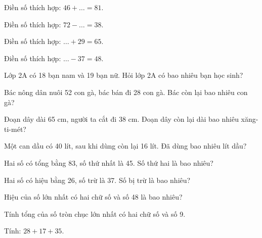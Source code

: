 \begin{ex}
Điền số thích hợp: $46 + \dots = 81$.
\end{ex}

\begin{ex}
Điền số thích hợp: $72 - \dots = 38$.
\end{ex}

\begin{ex}
Điền số thích hợp: $\dots + 29 = 65$.
\end{ex}

\begin{ex}
Điền số thích hợp: $\dots - 37 = 48$.
\end{ex}

\begin{ex}
Lớp 2A có 18 bạn nam và 19 bạn nữ. Hỏi lớp 2A có bao nhiêu bạn học sinh?
\end{ex}

\begin{ex}
Bác nông dân nuôi 52 con gà, bác bán đi 28 con gà. Bác còn lại bao nhiêu con gà?
\end{ex}

\begin{ex}
Đoạn dây dài 65 cm, người ta cắt đi 38 cm. Đoạn dây còn lại dài bao nhiêu xăng-ti-mét?
\end{ex}

\begin{ex}
Một can dầu có 40 lít, sau khi dùng còn lại 16 lít. Đã dùng bao nhiêu lít dầu?
\end{ex}

\begin{ex}
Hai số có tổng bằng 83, số thứ nhất là 45. Số thứ hai là bao nhiêu?
\end{ex}

\begin{ex}
Hai số có hiệu bằng 26, số trừ là 37. Số bị trừ là bao nhiêu?
\end{ex}

\begin{ex}
Hiệu của số lớn nhất có hai chữ số và số 48 là bao nhiêu?
\end{ex}

\begin{ex}
Tính tổng của số tròn chục lớn nhất có hai chữ số và số 9.
\end{ex}

\begin{ex}
Tính: $28 + 17 + 35$.
\end{ex}
